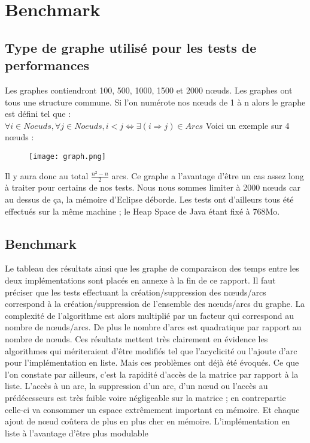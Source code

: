 \chapter{Benchmark}
\section{Type de graphe utilisé pour les tests de performances}
Les graphes contiendront 100, 500, 1000, 1500 et 2000 nœuds. Les graphes ont tous une structure
commune.
Si l'on numérote nos nœuds de 1 à n alors le graphe est défini tel que : \\
$\forall i\in Noeuds, \forall j  \in Noeuds, i<j \Leftrightarrow  \exists (i \Rightarrow j ) \in Arcs$
Voici un exemple sur 4 nœuds : \\
\begin{figure}[!h] 
\begin{center}
  \texttt{[image: graph.png]}
\end{center}
\end{figure} 

Il y aura donc au total $\frac{n^2-n}{2}$ arcs. Ce graphe a l'avantage d'être un cas assez long à traiter pour
certains de nos tests. Nous nous sommes limiter à 2000 nœuds car au dessus de ça, la mémoire
d'Eclipse déborde. Les tests ont d'ailleurs tous été effectués sur la même machine ; le Heap Space de
Java étant fixé à 768Mo.

\section{Benchmark}
Le tableau des résultats ainsi que les graphe de comparaison des temps entre les deux
implémentations sont placés en annexe à la fin de ce rapport.
Il faut préciser que les tests effectuant la création/suppression des nœuds/arcs correspond à la
création/suppression de l'ensemble des nœuds/arcs du graphe. La complexité de l'algorithme est
alors multiplié par un facteur qui correspond au nombre de nœuds/arcs. De plus le nombre d'arcs est
quadratique par rapport au nombre de nœuds.
Ces résultats mettent très clairement en évidence les algorithmes qui mériteraient d'être modifiés tel
que l'acyclicité ou l'ajoute d'arc pour l'implémentation en liste. Mais ces problèmes ont déjà été
évoqués.
Ce que l'on constate par ailleurs, c'est la rapidité d'accès de la matrice par rapport à la liste. L'accès
à un arc, la suppression d'un arc, d'un nœud ou l'accès au prédécesseurs est très faible voire
négligeable sur la matrice ; en contrepartie celle-ci va consommer un espace extrêmement important
en mémoire. Et chaque ajout de nœud coûtera de plus en plus cher en mémoire. L'implémentation
en liste à l'avantage d'être plus modulable

